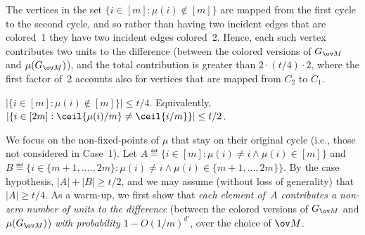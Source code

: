 The vertices in the set $\{i\in[m]:\mu(i)\not\in[m]\}$
are mapped from the first cycle to the second cycle,
and so rather than having two incident edges
that are colored~1 they have two incident edges colored~2.
%
Hence, each such vertex contributes two units to the difference
(between the colored versions of $G_{\ov M}$ and $\mu(G_{\ov M})$),
and the total contribution is greater than $2\cdot(t/4)\cdot 2$,
%
where the first factor of~2 accounts also for vertices
that are mapped from $C_2$ to $C_1$.

\item[{\em Case 2}:] $|\{i\in[m]:\mu(i)\not\in[m]\}|\leq t/4$.
Equivalently, $|\{i\in[2m]:\ceil{\mu(i)/m}\neq\ceil{i/m}\}|\leq t/2$.

We focus on the non-fixed-points of $\mu$ that stay on their
original cycle (i.e., those not considered in Case~1).
Let $A\eqdef\{i\!\in\![m]:\mu(i)\!\neq\!i\wedge\mu(i)\!\in\![m]\}$
and
$B\eqdef\{i\!\in\!\{m+1,....,2m\}:
   \mu(i)\!\neq\!i\wedge\mu(i)\!\in\!\{m+1,\ldots,2m\}\}$.
By the case hypothesis, $|A|+|B|\geq t/2$,
and we may assume (without loss of generality) that $|A|\geq t/4$.
As a warm-up, we first show that
{\em each element of~$A$ contributes
a non-zero number of units to the difference}\/
(between the colored versions of $G_{\ov M}$ and $\mu(G_{\ov M})$)
{\em with probability $1-O(1/m)^{d'}$}, over the choice of $\ov M$.

